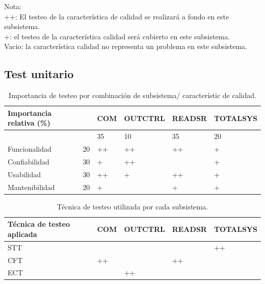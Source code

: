 \documentclass[11pt]{article}
\begin{document}
Nota:\\
++: El testeo de la característica de calidad se realizará a fondo en este
subsistema.\\
+: el testeo de la característica calidad será cubierto en este subsistema.
\\Vacio: la característica calidad no representa un problema en este subsistema.
\\

\subsection{Test unitario}
\FloatBarrier
\begin{table}[!ht]
    \centering
    \begin{tabular}{|l|l|l|l|l|l|}\hline \hline
        \rowcolor[HTML]{d6c6c3}
        Importancia relativa (\%) &    & COM & OUTCTRL & READSR & TOTALSYS \\
        \hline

                                  &    & 35  & 10      & 35     & 20       \\
        Funcionalidad             & 20 & ++  & ++      & ++     & +        \\
        Confiabilidad             & 30 & +   & ++      &        & +        \\
        Usabilidad                & 30 & ++  & +       & ++     & +        \\
        Mantenibilidad            & 20 & +   &         & +      & +        \\
        \hline
    \end{tabular}
    \caption{Importancia de testeo por combinación de subsistema/ característic
        de calidad.}
\end{table}

\FloatBarrier
\begin{table}[!ht]
    \centering
    \begin{tabular}{|l|l|l|l|l|}\hline \hline
        \rowcolor[HTML]{d6c6c3}
        Técnica de testeo aplicada & COM & OUTCTRL & READSR & TOTALSYS \\
        \hline
        STT                        &     &         &        & ++       \\
        CFT                        & ++  &         & ++     &          \\
        ECT                        &     & ++      &        &          \\
        \hline
    \end{tabular}
    \caption{Técnica de testeo utilizada por cada subsistema.}
\end{table}
\end{document}
